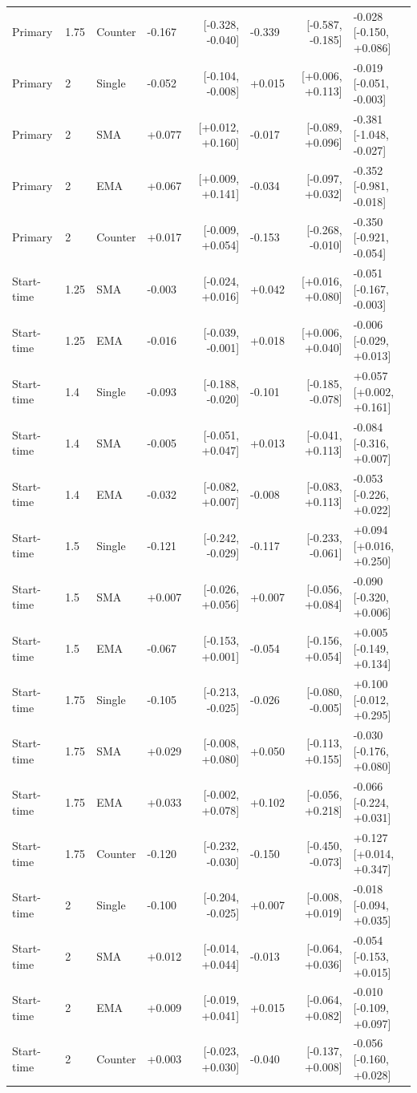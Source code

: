 {\begin{longtable}{llllrlrl}
Primary & 1.75 & Counter & -0.167 & [-0.328, -0.040] & -0.339 & [-0.587, -0.185] & -0.028 [-0.150, +0.086]\\
Primary & 2 & Single & -0.052 & [-0.104, -0.008] & +0.015 & [+0.006, +0.113] & -0.019 [-0.051, -0.003]\\
Primary & 2 & SMA & +0.077 & [+0.012, +0.160] & -0.017 & [-0.089, +0.096] & -0.381 [-1.048, -0.027]\\
Primary & 2 & EMA & +0.067 & [+0.009, +0.141] & -0.034 & [-0.097, +0.032] & -0.352 [-0.981, -0.018]\\
Primary & 2 & Counter & +0.017 & [-0.009, +0.054] & -0.153 & [-0.268, -0.010] & -0.350 [-0.921, -0.054]\\
Start-time & 1.25 & SMA & -0.003 & [-0.024, +0.016] & +0.042 & [+0.016, +0.080] & -0.051 [-0.167, -0.003]\\
Start-time & 1.25 & EMA & -0.016 & [-0.039, -0.001] & +0.018 & [+0.006, +0.040] & -0.006 [-0.029, +0.013]\\
Start-time & 1.4 & Single & -0.093 & [-0.188, -0.020] & -0.101 & [-0.185, -0.078] & +0.057 [+0.002, +0.161]\\
Start-time & 1.4 & SMA & -0.005 & [-0.051, +0.047] & +0.013 & [-0.041, +0.113] & -0.084 [-0.316, +0.007]\\
Start-time & 1.4 & EMA & -0.032 & [-0.082, +0.007] & -0.008 & [-0.083, +0.113] & -0.053 [-0.226, +0.022]\\
Start-time & 1.5 & Single & -0.121 & [-0.242, -0.029] & -0.117 & [-0.233, -0.061] & +0.094 [+0.016, +0.250]\\
Start-time & 1.5 & SMA & +0.007 & [-0.026, +0.056] & +0.007 & [-0.056, +0.084] & -0.090 [-0.320, +0.006]\\
Start-time & 1.5 & EMA & -0.067 & [-0.153, +0.001] & -0.054 & [-0.156, +0.054] & +0.005 [-0.149, +0.134]\\
Start-time & 1.75 & Single & -0.105 & [-0.213, -0.025] & -0.026 & [-0.080, -0.005] & +0.100 [-0.012, +0.295]\\
Start-time & 1.75 & SMA & +0.029 & [-0.008, +0.080] & +0.050 & [-0.113, +0.155] & -0.030 [-0.176, +0.080]\\
Start-time & 1.75 & EMA & +0.033 & [-0.002, +0.078] & +0.102 & [-0.056, +0.218] & -0.066 [-0.224, +0.031]\\
Start-time & 1.75 & Counter & -0.120 & [-0.232, -0.030] & -0.150 & [-0.450, -0.073] & +0.127 [+0.014, +0.347]\\
Start-time & 2 & Single & -0.100 & [-0.204, -0.025] & +0.007 & [-0.008, +0.019] & -0.018 [-0.094, +0.035]\\
Start-time & 2 & SMA & +0.012 & [-0.014, +0.044] & -0.013 & [-0.064, +0.036] & -0.054 [-0.153, +0.015]\\
Start-time & 2 & EMA & +0.009 & [-0.019, +0.041] & +0.015 & [-0.064, +0.082] & -0.010 [-0.109, +0.097]\\
Start-time & 2 & Counter & +0.003 & [-0.023, +0.030] & -0.040 & [-0.137, +0.008] & -0.056 [-0.160, +0.028]\\
\end{longtable}}
